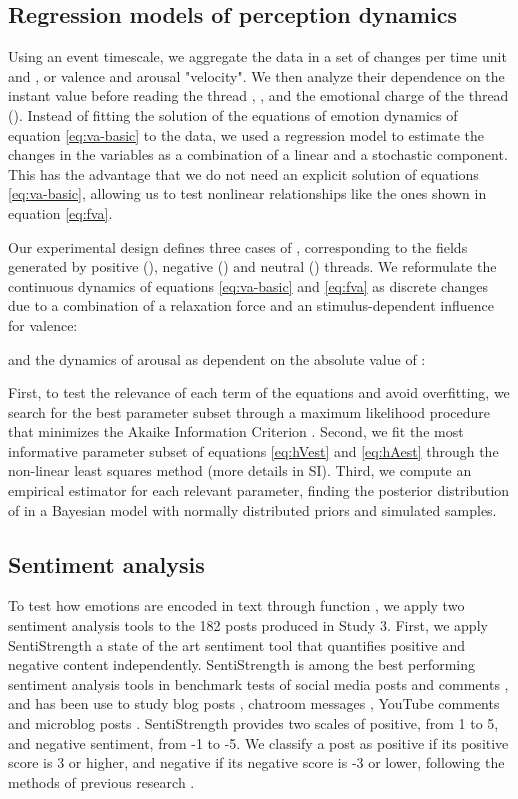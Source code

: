 \documentclass[nologo,url,11pt,a4paper]{ETHpaper}
\begin{document}
\subsection{Regression models of perception dynamics}

Using an event timescale, we aggregate the data in a set of changes per
time unit  and , or valence and arousal "velocity". 
We then analyze their dependence on the instant value before reading the thread , , and the emotional charge of the thread (). 
Instead of fitting the solution of the equations of emotion dynamics of equation \ref{eq:va-basic} to the data, we used a regression model to estimate the changes in the variables as a combination of a linear and  a stochastic component.  
This has the advantage  that we do not need an explicit solution of equations \ref{eq:va-basic}, allowing us to test nonlinear relationships like the ones shown in equation \ref{eq:fva}.

Our experimental design defines three cases of , corresponding to the fields generated by  positive (), negative () and neutral () threads. 
We reformulate the continuous dynamics of equations \ref{eq:va-basic} and \ref{eq:fva} as discrete changes due to a combination of a relaxation force and an stimulus-dependent influence for valence:

and the dynamics of arousal as dependent on the absolute value of :


First, to test the relevance of each term of the equations and avoid
overfitting,  we search for the best parameter subset through a maximum
likelihood procedure \cite{Venables2002} that minimizes  the  Akaike
Information Criterion \cite{Akaike1981}. Second, we fit the most informative
parameter subset of equations \ref{eq:hVest} and \ref{eq:hAest} through the
non-linear least squares method \cite{Bates1988} (more details in SI). Third, we compute an empirical estimator  for each relevant parameter, finding the
posterior distribution of  in a Bayesian model with normally
distributed priors \cite{Gelman2008} and  simulated samples.

\subsection{Sentiment analysis}

To test how emotions are encoded in text through function , we apply two
sentiment analysis tools to  the 182 posts produced in Study 3. First, we
apply SentiStrength \cite{Thelwall2010} a state of the art sentiment tool that
quantifies positive and negative content independently. SentiStrength is among
the best performing sentiment analysis tools in benchmark tests of social
media posts and comments \cite{Goncalves2013}, and has been use to study blog
posts \cite{Chmiel2011}, chatroom messages \cite{Garas2012}, YouTube comments
\cite{Garcia2012} and microblog posts \cite{Thelwall2011}. SentiStrength
provides two scales of positive, from 1 to 5, and negative sentiment, from -1
to -5. We classify a post as positive if its positive score is 3 or higher,
and negative if its negative score is -3 or lower, following the methods of
previous research \cite{Thelwall2010,Thelwall2011,Garcia2012}.
\end{document}
